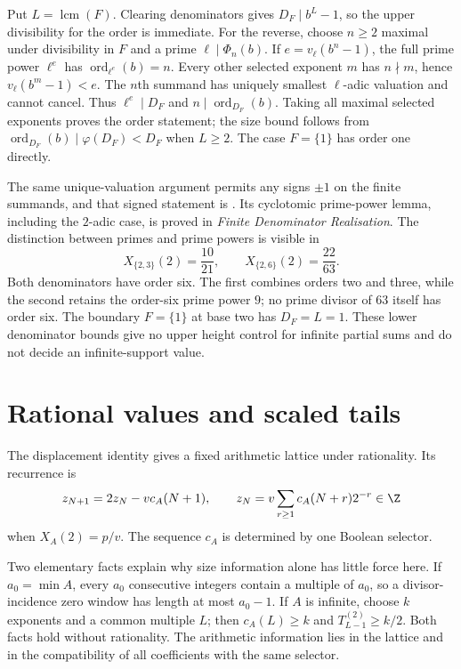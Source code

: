 \documentclass[11pt]{article}
\begin{document}
Put $L=\operatorname{lcm}(F)$.  Clearing denominators gives
$D_F\mid b^L-1$, so the upper divisibility for the order is immediate.
For the reverse, choose $n\ge2$ maximal under divisibility in $F$ and a
prime $\ell\mid\Phi_n(b)$.  If $e=v_\ell(b^n-1)$, the full prime power
$\ell^e$ has $\operatorname{ord}_{\ell^e}(b)=n$.
Every other selected exponent $m$ has $n\nmid m$, hence
$v_\ell(b^m-1)<e$.  The $n$th summand has uniquely smallest $\ell$-adic
valuation and cannot cancel.  Thus $\ell^e\mid D_F$ and
$n\mid\operatorname{ord}_{D_F}(b)$.  Taking all maximal selected exponents
proves the order statement; the size bound follows from
$\operatorname{ord}_{D_F}(b)\mid\varphi(D_F)<D_F$ when $L\ge2$.
The case $F=\{1\}$ has order one directly.

The same unique-valuation argument permits any signs $\pm1$ on the
finite summands, and that signed statement is
\href{https://github.com/wcook04/plectis-erdos/blob/f36a98bf3d3e6f65f1074e3b800e3293d5b8a51a/ErdosProblems/Erdos257/SignedFinitePeriodNoncollapse.lean#L507}{}.  Its cyclotomic prime-power lemma, including the
$2$-adic case, is proved in \emph{Finite Denominator Realisation}.
The distinction between primes and prime powers is visible in
\[
 X_{\{2,3\}}(2)=\frac{10}{21},\qquad
 X_{\{2,6\}}(2)=\frac{22}{63}.
\]
Both denominators have order six.  The first combines orders two and
three, while the second retains the order-six prime power $9$;
no prime divisor of $63$ itself has order six.
The boundary $F=\{1\}$ at base two has $D_F=L=1$.
These lower denominator bounds give no upper height control for infinite
partial sums and do not decide an infinite-support value.

\section{Rational values and scaled tails}\label{sec:forced}
The displacement identity gives a fixed arithmetic lattice under rationality.
Its recurrence is
\[
 z_{N+1}=2z_N-vc_A(N+1),\qquad
 z_N=v\sum_{r\ge1}c_A(N+r)2^{-r}\in\Z
\]
when $X_A(2)=p/v$.  The sequence $c_A$ is determined by one Boolean selector.

Two elementary facts explain why size information alone has little force
here.  If $a_0=\min A$, every $a_0$ consecutive integers contain a multiple
of $a_0$, so a divisor-incidence zero window has length at most $a_0-1$.
If $A$ is infinite, choose $k$ exponents and a common multiple $L$;
then $c_A(L)\ge k$ and $T_{L-1}^{(2)}\ge k/2$.
Both facts hold without rationality.  The arithmetic information lies in
the lattice and in the compatibility of all coefficients with the same
selector.
\end{document}
